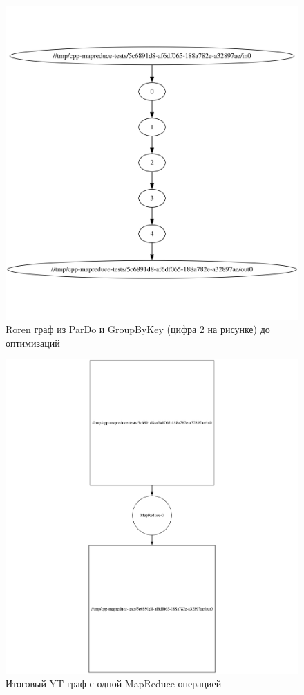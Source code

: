 \begin{figure}[h]
    \centering
    \includegraphics[width=\textwidth]{img/mrroren.png}
    \caption{Roren граф из ParDo и GroupByKey (цифра 2 на рисунке) до оптимизаций}
    \label{fig:mrroren}
\end{figure}

\begin{figure}[h]
    \centering
    \includegraphics[width=\textwidth]{img/mrytgraph.png}
    \caption{Итоговый YT граф с одной MapReduce операцией}
    \label{fig:mrytgraph}
\end{figure}

